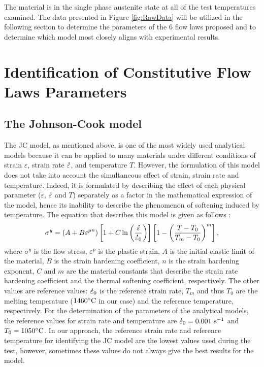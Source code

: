 \documentclass[metals,article,submit,pdftex,moreauthors]{Definitions/mdpi}
\DeclareRobustCommand{\mdot}[1]{\accentset{\mbox{\bfseries .}}{#1}}
\DeclareRobustCommand{\ps}{\text{s}^{-1}}
\begin{document}
The material is in the single phase austenite state at all of the test temperatures examined.
The data presented in Figure \ref{fig:RawData} will be utilized in the following section to determine the parameters of the $6$ flow laws proposed and to determine which model most closely aligns with experimental results.

\section{Identification of Constitutive Flow Laws Parameters\label{sec:ConstLaws}}
\subsection{The Johnson-Cook model\label{sec:JC}}

The JC model, as mentioned above, is one of the most widely used analytical models because it can be applied to many materials under different conditions of strain $\varepsilon$, strain rate $\mdot\varepsilon$, and temperature $T$.
However, the formulation of this model does not take into account the simultaneous effect of strain, strain rate and temperature.
Indeed, it is formulated by describing the effect of each physical parameter ($\varepsilon$, $\mdot\varepsilon$ and $T$) separately as a factor in the mathematical expression of the model, hence its inability to describe the phenomenon of softening induced by temperature.
The equation that describes this model is given as follows \cite{Johnson-1983}:
\begin{equation}
\sigma^y=\left(A+B{\varepsilon^p}^{n}\right) \left[1+C\ln\left(\frac{\mdot\varepsilon}{\mdot\varepsilon_0}\right)\right] \left[1-\left(\frac{T-T_0}{T_m-T_0}\right)^{m}\right],\label{eq:Johnson-Cook}
\end{equation}
where $\sigma^y$ is the flow stress, $\varepsilon^p$ is the plastic strain, $A$ is the initial elastic limit of the material, $B$ is the strain hardening coefficient, $n$ is the strain hardening exponent, $C$ and $m$ are the material constants that describe the strain rate hardening coefficient and the thermal softening coefficient, respectively.
The other values are reference values: $\mdot\varepsilon_0$ is the reference strain rate, $T_m$ and thus $T_0$ are the melting temperature ($1460\celsius$ in our case) and the reference temperature, respectively.
For the determination of the parameters of the analytical models, the reference values for strain rate and temperature are $\mdot\varepsilon_0=0.001~\ps$ and $T_0=1050\celsius$.
In our approach, the reference strain rate and reference temperature for identifying the JC model are the lowest values used during the test, however, sometimes these values do not always give the best results for the model.
\end{document}
